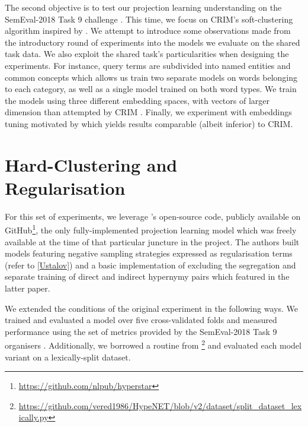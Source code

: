 The second objective is to test our projection learning understanding on the SemEval-2018 Task 9 challenge \citep{camacho2018semeval}.  This time, we focus on CRIM's soft-clustering algorithm \citep{bernier2018crim} inspired by \citeauthor{yamane2016distributional}.  We attempt to introduce some observations made from the introductory round of experiments into the models we evaluate on the shared task data.  We also exploit the shared task's particularities when designing the experiments.  For instance, query terms are subdivided into named entities and common concepts which allows us train two separate models on words belonging to each category, as well as a single model trained on both word types.  We train the models using three different embedding spaces, with vectors of larger dimension than attempted by CRIM \citep{bernier2018crim}.  Finally, we experiment with embeddings tuning motivated by \cite{howard2018universal} which yields results comparable (albeit inferior) to CRIM.  


\section{Hard-Clustering and Regularisation} \label{ustalov_experiment}
For this set of experiments, we leverage \citeauthor{ustalov2017negative}'s open-source code, publicly available on GitHub\footnote{\url{https://github.com/nlpub/hyperstar}}, the only fully-implemented projection learning model which was freely available at the time of that particular juncture in the project.  The authors built models featuring  negative sampling strategies expressed as regularisation terms (refer to \cref{Ustalov}) and a basic implementation of \cite{Fu2014} excluding the segregation and separate training of direct and indirect hypernymy pairs which featured in the latter paper.

We extended the conditions of the original experiment in the following ways.  We trained and evaluated a model over five cross-validated folds and measured performance using the set of metrics provided by the SemEval-2018 Task 9 organisers \citep{camacho2018semeval}.  Additionally, we borrowed a routine from \cite{shwartz2016path}\footnote{\url{https://github.com/vered1986/HypeNET/blob/v2/dataset/split_dataset_lexically.py}} and evaluated each model variant on a lexically-split dataset.  

